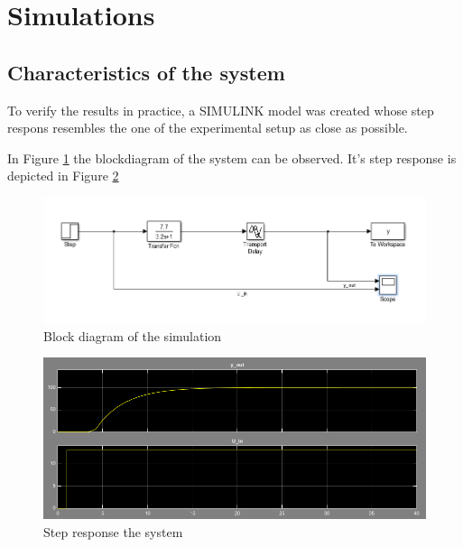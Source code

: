 \section{Simulations}

\subsection{Characteristics of the system}

To verify the results in practice, a SIMULINK model was created whose step respons resembles the one of the experimental setup as close as possible.

In Figure \ref{fig:block_dia_simu} the blockdiagram of the system can be observed. It's step response is depicted in Figure \ref{fig:step_resp_simu}

\begin{figure}[H]
\begin{center}
\includegraphics[width=1\linewidth]{images/general/block_dia_simu}
\end{center}
\caption{Block diagram of the simulation}
\label{fig:block_dia_simu}
\end{figure}

\begin{figure}[H]
\begin{center}
\includegraphics[width=1\linewidth]{images/general/step_resp_simu}
\end{center}
\caption{Step response the system}
\label{fig:step_resp_simu}
\end{figure}